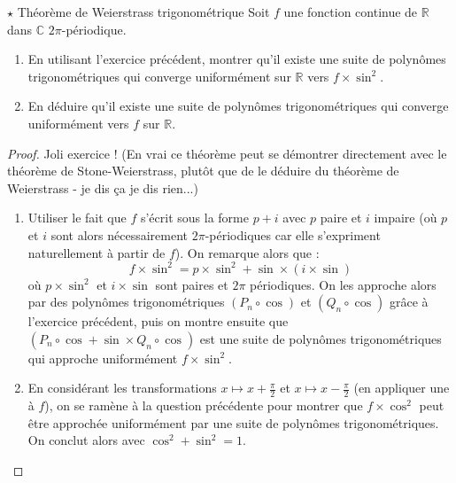 \documentclass[french,a4paper]{article}
\newcommand{\R}{\mathbb{R}}
\newcommand{\C}{\mathbb{C}}
\theoremstyle{plain}
\theoremstyle{definition}
\theoremstyle{remark}
\begin{document}
\begin{ex}[]{$\star$ Théorème de Weierstrass trigonométrique}
	Soit $f$ une fonction continue de $\R$ dans $\C$ $2\pi$-périodique.
	\begin{enumerate}
		\item En utilisant l'exercice précédent, montrer qu'il existe une suite de polynômes trigonométriques qui converge uniformément sur $\R$ vers $f\times\sin^2$.
		\item En déduire qu'il existe une suite de polynômes trigonométriques qui converge uniformément vers $f$ sur $\R$.
	\end{enumerate}
\end{ex}
\begin{proof}
	Joli exercice ! (En vrai ce théorème peut se démontrer directement avec le théorème de Stone-Weierstrass, plutôt que de le déduire du théorème de Weierstrass - je dis ça je dis rien...)
	\begin{enumerate}
		\item Utiliser le fait que $f$ s'écrit sous la forme $p+i$ avec $p$ paire et $i$ impaire (où $p$ et $i$ sont alors nécessairement $2\pi$-périodiques car elle s'expriment naturellement à partir de $f$). On remarque alors que : $$f\times\sin^2=p\times\sin^2+\sin\times(i\times\sin)$$ où $p\times\sin^2$ et $i\times\sin$ sont paires et $2\pi$ périodiques. On les approche alors par des polynômes trigonométriques $(P_n\circ\cos)$ et $(Q_n\circ\cos)$ grâce à l'exercice précédent, puis on montre ensuite que $(P_n\circ\cos+\sin\times Q_n\circ\cos)$ est une suite de polynômes trigonométriques qui approche uniformément $f\times\sin^2$.
		\item En considérant les transformations $x\mapsto x+\displaystyle\frac{\pi}{2}$ et $x\mapsto x-\displaystyle\frac{\pi}{2}$ (en appliquer une à $f$), on se ramène à la question précédente pour montrer que $f\times\cos^2$ peut être approchée uniformément par une suite de polynômes trigonométriques. On conclut alors avec $\cos^2+\sin^2=1$.
	\end{enumerate}
\end{proof}
\end{document}
